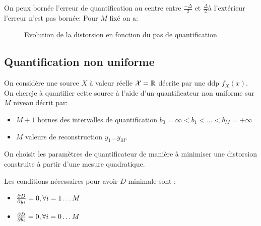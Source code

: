 \documentclass[main.tex]{subfiles}
\begin{document}
On peux bornée l'erreur de quantification au centre entre $\frac{-\Delta}{2}$ et $\frac{\Delta}{2}$à l'extérieur l'erreur n'est pas bornée:
Pour $M$ fixé on a:
\begin{figure}[H]
  \centering
  \caption{Evolution de la distorsion en fonction du pas de quantification}
\end{figure}


\subsection{Quantification non uniforme}

On considère une source $X$ à valeur réelle $\mathcal{X} =\R$ décrite par une ddp $f_X(x)$. On chercje à quantifier cette source à l'aide d'un quantificateur non uniforme sur $M$ niveau décrit par:
\begin{itemize}
\item $M+1$ bornes des intervalles de quantification $b_0=\infty < b_1 < ... <b_M=+\infty$
\item $M$ valeurs de reconstruction $y_1 ... y_M$.
\end{itemize}
On choisit les paramètres de quantificateur de manière à minimiser une distorsion construite à partir d'une mesure quadratique.

Les conditions nécessaires pour avoir $D$ minimale sont :
\begin{itemize}
\item $\derivp[D]{y_i} = 0, \forall i=1\dots M$
\item $\derivp[D]{b_i} = 0, \forall i = 0\dots M$
\end{itemize}
\end{document}
